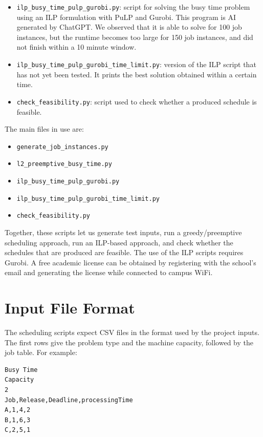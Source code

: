 \documentclass[12pt]{article}
\begin{document}
\begin{itemize}
    \item \texttt{ilp\_busy\_time\_pulp\_gurobi.py}: script for solving the busy
    time problem using an ILP formulation with PuLP and Gurobi. This program is AI generated by ChatGPT. We observed that it is able to solve for 100 job instances, but the runtime becomes too large for 150 job instances, and did not finish within a 10 minute window.

    \item \texttt{ilp\_busy\_time\_pulp\_gurobi\_time\_limit.py}: version of the
    ILP script that has not yet been tested. It prints the best solution obtained within a certain time.

    \item \texttt{check\_feasibility.py}: script used to check whether a produced
    schedule is feasible.
\end{itemize}

The main files in use are:

\begin{itemize}[leftmargin=*]
    \item \texttt{generate\_job\_instances.py}
    \item \texttt{l2\_preemptive\_busy\_time.py}
    \item \texttt{ilp\_busy\_time\_pulp\_gurobi.py}
    \item \texttt{ilp\_busy\_time\_pulp\_gurobi\_time\_limit.py}
    \item \texttt{check\_feasibility.py}
\end{itemize}

Together, these scripts let us generate test inputs, run a greedy/preemptive
scheduling approach, run an ILP-based approach, and check whether the schedules
that are produced are feasible. The use of the ILP scripts requires Gurobi. A
free academic license can be obtained by registering with the school's email and
generating the license while connected to campus WiFi.

\section*{Input File Format}

The scheduling scripts expect CSV files in the format used by the project
inputs. The first rows give the problem type and the machine capacity, followed
by the job table. For example:

\begin{verbatim}
Busy Time
Capacity
2
Job,Release,Deadline,processingTime
A,1,4,2
B,1,6,3
C,2,5,1
\end{verbatim}
\end{document}
